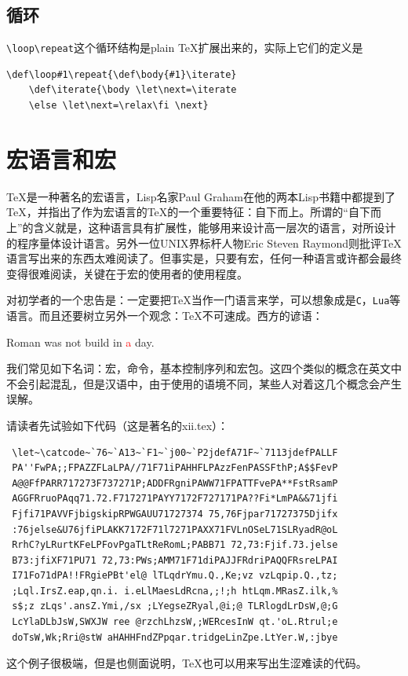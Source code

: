 \documentclass{article}
\newcommand{\Rtxt}[1]{\textcolor{red}{#1}}
\begin{document}
\subsection{循环}
\verb!\loop\repeat!这个循环结构是plain \TeX 扩展出来的，实际上它们的定义是
\begin{verbatim}
\def\loop#1\repeat{\def\body{#1}\iterate}
    \def\iterate{\body \let\next=\iterate
    \else \let\next=\relax\fi \next}
\end{verbatim}
\section{宏语言和宏}
\TeX 是一种著名的宏语言，Lisp名家Paul Graham在他的两本Lisp书籍中都提到了\TeX ，并指出了作为宏语言的\TeX 的一个重要特征：自下而上。所谓的“自下而上”的含义就是，这种语言具有扩展性，能够用来设计高一层次的语言，对所设计的程序量体设计语言。另外一位UNIX界标杆人物Eric Steven Raymond则批评\TeX 语言写出来的东西太难阅读了。但事实是，只要有宏，任何一种语言或许都会最终变得很难阅读，关键在于宏的使用者的使用程度。

对初学者的一个忠告是：一定要把\TeX 当作一门语言来学，可以想象成是\verb!C!，\verb!Lua!等语言。而且还要树立另外一个观念：\TeX 不可速成。西方的谚语：
\begin{center}
Roman was not build in \Rtxt{a} day.
\end{center}

我们常见如下名词：宏，命令，基本控制序列和宏包。这四个类似的概念在英文中不会引起混乱，但是汉语中，由于使用的语境不同，某些人对着这几个概念会产生误解。

请读者先试验如下代码（这是著名的xii.tex）：
\begin{verbatim}
 \let~\catcode~`76~`A13~`F1~`j00~`P2jdefA71F~`7113jdefPALLF
 PA''FwPA;;FPAZZFLaLPA//71F71iPAHHFLPAzzFenPASSFthP;A$$FevP
 A@@FfPARR717273F737271P;ADDFRgniPAWW71FPATTFvePA**FstRsamP
 AGGFRruoPAqq71.72.F717271PAYY7172F727171PA??Fi*LmPA&&71jfi
 Fjfi71PAVVFjbigskipRPWGAUU71727374 75,76Fjpar71727375Djifx
 :76jelse&U76jfiPLAKK7172F71l7271PAXX71FVLnOSeL71SLRyadR@oL
 RrhC?yLRurtKFeLPFovPgaTLtReRomL;PABB71 72,73:Fjif.73.jelse
 B73:jfiXF71PU71 72,73:PWs;AMM71F71diPAJJFRdriPAQQFRsreLPAI
 I71Fo71dPA!!FRgiePBt'el@ lTLqdrYmu.Q.,Ke;vz vzLqpip.Q.,tz;
 ;Lql.IrsZ.eap,qn.i. i.eLlMaesLdRcna,;!;h htLqm.MRasZ.ilk,%
 s$;z zLqs'.ansZ.Ymi,/sx ;LYegseZRyal,@i;@ TLRlogdLrDsW,@;G
 LcYlaDLbJsW,SWXJW ree @rzchLhzsW,;WERcesInW qt.'oL.Rtrul;e
 doTsW,Wk;Rri@stW aHAHHFndZPpqar.tridgeLinZpe.LtYer.W,:jbye
\end{verbatim}
这个例子很极端，但是也侧面说明，\TeX 也可以用来写出生涩难读的代码。
\end{document}
